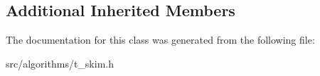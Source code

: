 \subsection*{Additional Inherited Members}


The documentation for this class was generated from the following file\+:\begin{DoxyCompactItemize}
\item 
src/algorithms/t\+\_\+skim.\+h\end{DoxyCompactItemize}
